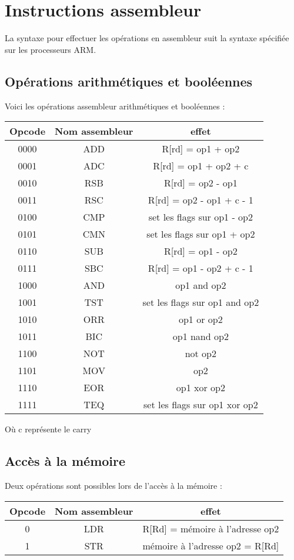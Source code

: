 \documentclass[a4paper]{article}
\begin{document}
\section{Instructions assembleur}

La syntaxe pour effectuer les opérations en assembleur suit la syntaxe spécifiée
sur les processeurs ARM.

\subsection{Opérations arithmétiques et booléennes}

Voici les opérations assembleur arithmétiques et booléennes :\\

\begin{tabular}{|c|c|c|}
  \hline
  Opcode & Nom assembleur & effet \\
  \hline
  0000 & ADD & R[rd] = op1 + op2\\
  0001 & ADC & R[rd] = op1 + op2 + c\\
  0010 & RSB & R[rd] = op2 - op1\\
  0011 & RSC & R[rd] = op2 - op1 + c - 1\\
  0100 & CMP & set les flags sur op1 - op2\\
  0101 & CMN & set les flags sur op1 + op2\\
  0110 & SUB & R[rd] = op1 - op2 \\
  0111 & SBC & R[rd] = op1 - op2 + c - 1\\
  1000 & AND & op1 and op2\\
  1001 & TST & set les flags sur op1 and op2\\
  1010 & ORR & op1 or op2\\
  1011 & BIC & op1 nand op2\\
  1100 & NOT & not op2\\
  1101 & MOV & op2\\
  1110 & EOR & op1 xor op2\\
  1111 & TEQ & set les flags sur op1 xor op2\\
  \hline
\end{tabular}

Où c représente le carry

\subsection{Accès à la mémoire}

Deux opérations sont possibles lors de l'accès à la mémoire :\\

\begin{tabular}{|c|c|c|}
  \hline
  Opcode & Nom assembleur & effet\\
  \hline
  0 & LDR & R[Rd] = mémoire à l'adresse op2\\
  1 & STR & mémoire à l'adresse op2 = R[Rd]\\
  \hline

\end{tabular}
\end{document}
